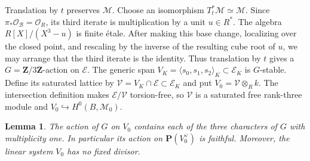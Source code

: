 \documentclass[12pt]{amsart}
\numberwithin{equation}{section}
\newtheorem{lemma}[theorem]{Lemma}
\theoremstyle{definition}
\theoremstyle{remark}
\newcommand{\Z}{\mathbf Z}
\newcommand{\PP}{\mathbf P}
\begin{document}
Translation by $t$ preserves $\mathscr M$.  Choose an isomorphism
$T_t^*\mathscr M\simeq\mathscr M$.  Since
$\pi_*\mathcal O_{\mathscr B}=\mathcal O_R$, its third iterate is
multiplication by a unit $u\in R^*$.  The algebra
$R[X]/(X^3-u)$ is finite \'etale.  After making this base change,
localizing over the closed point, and rescaling by the inverse of the
resulting cube root of $u$, we may arrange that the third iterate is the
identity.  Thus translation by $t$ gives a
$G=\Z/3\Z$-action on $\mathscr E$.  The generic span
$V_K=\langle s_0,s_1,s_2\rangle_K\subset\mathscr E_K$ is $G$-stable.
Define its saturated lattice by
$\mathscr V=V_K\cap\mathscr E\subset\mathscr E_K$ and put
$V_0=\mathscr V\otimes_Rk$.  The intersection definition makes
$\mathscr E/\mathscr V$ torsion-free, so $\mathscr V$ is a saturated free
rank-three module and $V_0\hookrightarrow H^0(B,\mathscr M_0)$.

\begin{lemma}
\label{lem:13-limit-system}
The action of $G$ on $V_0$ contains each of the three characters of $G$
with multiplicity one.  In particular its action on
$\PP(V_0^\vee)$ is faithful.  Moreover, the linear system $V_0$ has no
fixed divisor.
\end{lemma}
\end{document}
